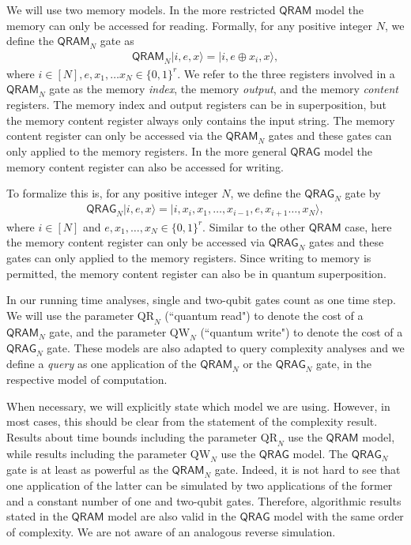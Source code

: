 \documentclass[12pt]{article}
\newcommand{\qr}{\mathrm{QR}}
\newcommand{\qw}{\mathrm{QW}}
\theoremstyle{definition}
\begin{document}
We will use two memory models. In the more restricted $\mathsf{QRAM}$ model the memory can only be accessed for reading.
Formally, for any positive integer $N$, we define the  $ \mathsf{QRAM}_N$ gate as
   \begin{align*}
        \mathsf{QRAM}_N |i, e, x \rangle = |i, e \oplus x_i,  x\rangle,
    \end{align*}
where $i\in[N], e, x_1, \ldots x_N \in\{0,1\}^r$.    
We refer to the three registers involved in a $ \mathsf{QRAM}_N$ gate as the memory {\em index}, the memory {\em output}, and the memory {\em content} registers.
The memory index and output registers can be in superposition, but the memory content register always only contains the input string.
The memory content register can only be accessed via the $\mathsf{QRAM}_N$ gates and these gates can only applied to the memory registers.
In the more general $\mathsf{QRAG}$  model the memory content register can also be accessed for writing.

To formalize this is, for any positive integer $N$, we define the $\mathsf{QRAG}_N$ gate by
    \begin{align*}
        \mathsf{QRAG}_N |i, e, x \rangle = |i, x_i, x_1,\dots,x_{i-1},e,x_{i+1}\dots, x_N \rangle, 
    \end{align*}
where
$i\in[N]$ and $e,x_1,\dots,x_{N} \in\{0,1\}^r.$
Similar to the other $\mathsf{QRAM}$ case, here the memory content register can only be accessed via $\mathsf{QRAG}_N$ gates and these gates can only applied to the memory registers.
Since writing to memory is permitted, the memory content register can also be in quantum superposition.

In our running time analyses, single and two-qubit gates count as one time step. We will use the parameter $\qr_N$ (``quantum read") to denote the cost of a $\mathsf{QRAM}_N$ gate, and the parameter $\qw_N$ (``quantum write") to denote the cost of a $\mathsf{QRAG}_{N}$ gate. These models are also adapted to query complexity analyses and we define a {\em query} as one application of the $\mathsf{QRAM}_N$ or the $\mathsf{QRAG}_{N}$ gate, in the respective model of computation. 

When necessary, we will explicitly state which model we are using. However, in most cases, this should be clear from the statement of the complexity result. Results
about time bounds including the parameter $\qr_N$ use the $ \mathsf{QRAM}$ model, while results including the parameter $\qw_N$ use the $\mathsf{QRAG}$
model. The $\mathsf{QRAG}_N$ gate is at least as powerful as the $ \mathsf{QRAM}_N$ gate. Indeed, it is not hard to see that one application of the latter can be simulated by two applications of the former and a constant number of one and two-qubit gates. Therefore, algorithmic results stated in the $ \mathsf{QRAM}$ model
are also valid in the $ \mathsf{QRAG}$ model with the same order of complexity.
We are not aware of an analogous reverse simulation.
\end{document}
